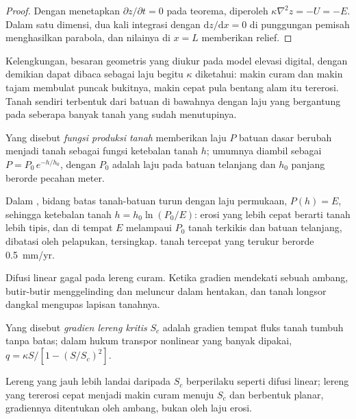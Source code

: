 \begin{proof}
Dengan menetapkan $\partial z/\partial t = 0$ pada teorema, diperoleh $\kappa\nabla^2 z =
-U = -E$. Dalam satu dimensi, dua kali integrasi dengan $\mathrm{d}z/\mathrm{d}x =
0$ di punggungan pemisah menghasilkan parabola, dan nilainya di $x = L$ memberikan relief.
\end{proof}

Kelengkungan, besaran geometris yang diukur pada model elevasi digital, dengan demikian
dapat dibaca sebagai laju begitu $\kappa$ diketahui: makin curam dan makin tajam
membulat puncak bukitnya, makin cepat pula bentang alam itu tererosi. Tanah sendiri terbentuk dari
batuan di bawahnya dengan laju yang bergantung pada seberapa banyak tanah yang sudah menutupinya.

\begin{definition}\label{def:b3:quantitative-geomorphology:soil-production}
Yang disebut \emph{fungsi produksi tanah} memberikan
laju $P$ batuan dasar berubah menjadi tanah sebagai fungsi
ketebalan tanah $h$; umumnya diambil sebagai $P = P_0\,e^{-h/h_0}$, dengan
$P_0$ adalah laju pada batuan telanjang dan $h_0$ panjang berorde pecahan meter.
\end{definition}

Dalam , bidang batas tanah-batuan turun dengan laju
permukaan, $P(h) = E$, sehingga ketebalan tanah $h = h_0 \ln(P_0/E)$: erosi yang lebih cepat
berarti tanah lebih tipis, dan di tempat $E$ melampaui $P_0$ tanah
terkikis dan batuan telanjang, dibatasi oleh pelapukan, tersingkap.  tanah tercepat yang terukur berorde \qty{0.5}{mm/yr}.

Difusi linear gagal pada lereng curam. Ketika gradien mendekati sebuah
ambang, butir-butir menggelinding dan meluncur dalam hentakan, dan tanah longsor dangkal mengupas
lapisan tanahnya.

\begin{definition}\label{def:b3:quantitative-geomorphology:critical}
Yang disebut \emph{gradien lereng kritis}
$S_c$ adalah gradien tempat fluks tanah tumbuh tanpa batas; dalam
hukum transpor nonlinear yang banyak dipakai, $q = \kappa S/[1 - (S/S_c)^2]$.
\end{definition}

Lereng yang jauh lebih landai daripada $S_c$ berperilaku seperti difusi linear; lereng yang
tererosi cepat menjadi makin curam menuju $S_c$ dan berbentuk planar, gradiennya ditentukan oleh
ambang, bukan oleh laju erosi.

